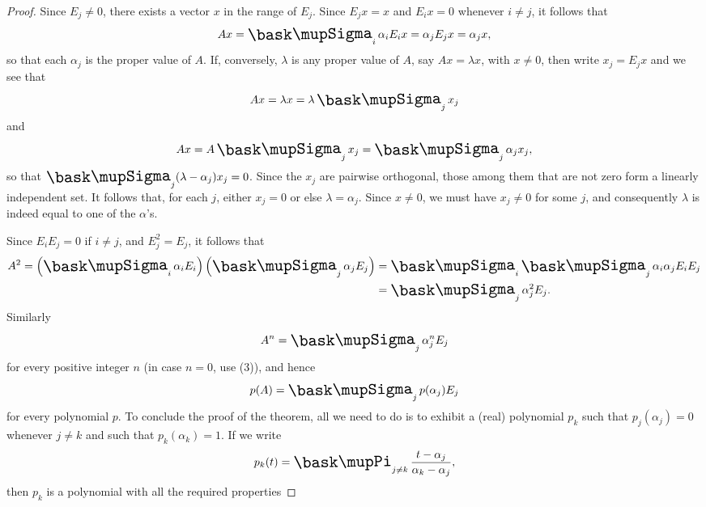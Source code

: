 \begin{proof}
    Since \(E_j \neq 0\), there exists a vector \(x\) in the range of \(E_j\).
    Since \(E_j x = x\) and \(E_i x = 0\) whenever \(i \neq j\), it follows that
    \begin{equation*}
        Ax = \sumx_i \alpha_i E_i x = \alpha_j E_j x = \alpha_j x,
    \end{equation*}
    so that each \(\alpha_j\) is the proper value of \(A\). If, conversely,
    \(\lambda\) is any proper value of \(A\), say \(Ax = \lambda x\), with \(x
    \neq 0\), then write \(x_j = E_j x\) and we see that
    \begin{equation*}
        Ax = \lambda x = \lambda \sumx_j x_j
    \end{equation*}
    and
    \begin{equation*}
        Ax = A \sumx_j x_j = \sumx_j \alpha_j x_j,
    \end{equation*}
    so that \(\sumx_j (\lambda - \alpha_j)x_j = 0\). Since the \(x_j\) are
    pairwise orthogonal, those among them that are not zero form a linearly
    independent set. It follows that, for each \(j\), either \(x_j = 0\) or else
    \(\lambda = \alpha_j\). Since \(x \neq 0\), we must have \(x_j \neq 0\) for
    some \(j\), and consequently \(\lambda\) is indeed equal to one of the
    \(\alpha\)'s.

    Since \(E_i E_j = 0\) if \(i \neq j\), and \(E_j^2 = E_j\), it follows that
    \begin{align*}
        A^2 = \left(\sumx_i\alpha_i E_i\right)\left(\sumx_j \alpha_j E_j\right)
        & = \sumx_i \sumx_j \alpha_i \alpha_j E_i E_j \\
        & = \sumx_j \alpha_j^2 E_j.
    \end{align*} 
    Similarly
    \begin{equation*}
        A^n = \sumx_j \alpha_j^n E_j
    \end{equation*}
    for every positive integer \(n\) (in case \(n = 0\), use (3)), and hence
    \begin{equation*}
        p(A) = \sumx_j p(\alpha_j) E_j
    \end{equation*}
    for every polynomial \(p\). To conclude the proof of the theorem, all we
    need to do is to exhibit a (real) polynomial \(p_k\) such that
    \(p_j(\alpha_j) = 0\) whenever \(j \neq k\) and such that \(p_k(\alpha_k) = 1\). If we write
    \begin{equation*}
        p_k(t) = \prodx_{j \neq k} \frac{t - \alpha_j}{\alpha_k - \alpha_j},
    \end{equation*}
    then \(p_k\) is a polynomial with all the required properties
\end{proof}


